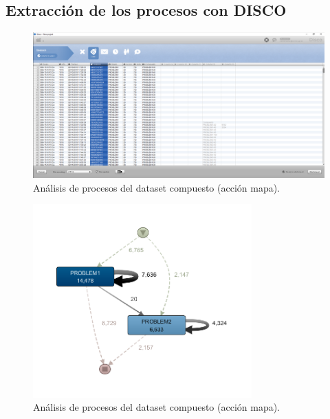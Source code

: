 \subsection{Extracción de los procesos con DISCO}

\begin{figure}[H]
    \centering
    \includegraphics[width=1.25\textwidth]{imagenes/DISCO_compound/DISCO.png}
    \caption{Análisis de procesos del dataset compuesto (acción mapa).}
    \label{fig:DISCO}
\end{figure}

\begin{figure}[H]
    \centering
    \includegraphics[width=0.75\textwidth]{imagenes/DISCO_map/Dataset Fusionado.png}
    \caption{Análisis de procesos del dataset compuesto (acción mapa).}
    \label{fig:datasetFusionado}
\end{figure}

